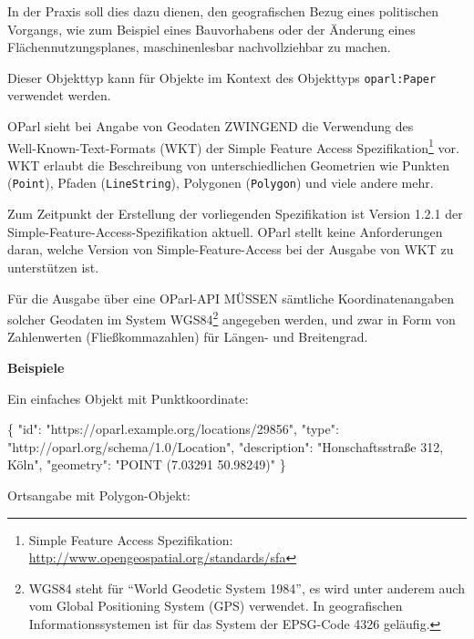 \documentclass[,a4paper]{article}
\newenvironment{Shaded}{}{}
\newcommand{\DataTypeTok}[1]{\textcolor[rgb]{0.56,0.13,0.00}{{#1}}}
\newcommand{\StringTok}[1]{\textcolor[rgb]{0.25,0.44,0.63}{{#1}}}
\newcommand{\FunctionTok}[1]{\textcolor[rgb]{0.02,0.16,0.49}{{#1}}}
\begin{document}
In der Praxis soll dies dazu dienen, den geografischen Bezug eines
politischen Vorgangs, wie zum Beispiel eines Bauvorhabens oder der
Änderung eines Flächennutzungsplanes, maschinenlesbar nachvollziehbar zu
machen.

Dieser Objekttyp kann für Objekte im Kontext des Objekttyps
\texttt{oparl:Paper} verwendet werden.

OParl sieht bei Angabe von Geodaten ZWINGEND die Verwendung
des\\Well-Known-Text-Formats (WKT) der Simple Feature Access
Spezifikation\footnote{Simple Feature Access Spezifikation:
  \url{http://www.opengeospatial.org/standards/sfa}} vor. WKT erlaubt
die Beschreibung von unterschiedlichen Geometrien wie Punkten
(\texttt{Point}), Pfaden (\texttt{LineString}), Polygonen
(\texttt{Polygon}) und viele andere mehr.

Zum Zeitpunkt der Erstellung der vorliegenden Spezifikation ist Version
1.2.1 der Simple-Feature-Access-Spezifikation aktuell. OParl stellt
keine Anforderungen daran, welche Version von Simple-Feature-Access bei
der Ausgabe von WKT zu unterstützen ist.

Für die Ausgabe über eine OParl-API MÜSSEN sämtliche Koordinatenangaben
solcher Geodaten im System WGS84\footnote{WGS84 steht für ``World
  Geodetic System 1984'', es wird unter anderem auch vom Global
  Positioning System (GPS) verwendet. In geografischen
  Informationssystemen ist für das System der EPSG-Code 4326 geläufig.}
angegeben werden, und zwar in Form von Zahlenwerten (Fließkommazahlen)
für Längen- und Breitengrad.

\textbf{Beispiele}

Ein einfaches Objekt mit Punktkoordinate:

\begin{Shaded}
\begin{Highlighting}[]
\FunctionTok{\{}
    \DataTypeTok{"id"}\FunctionTok{:} \StringTok{"https://oparl.example.org/locations/29856"}\FunctionTok{,}
    \DataTypeTok{"type"}\FunctionTok{:} \StringTok{"http://oparl.org/schema/1.0/Location"}\FunctionTok{,}
    \DataTypeTok{"description"}\FunctionTok{:} \StringTok{"Honschaftsstraße 312, Köln"}\FunctionTok{,}
    \DataTypeTok{"geometry"}\FunctionTok{:} \StringTok{"POINT (7.03291 50.98249)"}
\FunctionTok{\}}
\end{Highlighting}
\end{Shaded}

Ortsangabe mit Polygon-Objekt:
\end{document}
